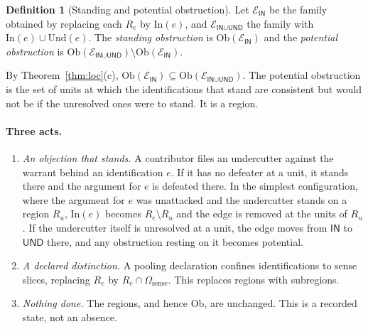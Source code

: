 \documentclass[11pt]{article}
\theoremstyle{plain}
\theoremstyle{definition}
\newtheorem{definition}[theorem]{Definition}
\theoremstyle{remark}
\newcommand{\Om}{\Omega}
\newcommand{\Ob}{\mathrm{Ob}}
\newcommand{\IN}{\textsf{IN}}
\newcommand{\UND}{\textsf{UND}}
\begin{document}
\begin{definition}[Standing and potential obstruction]
Let $\mathcal E_{\IN}$ be the family obtained by replacing each $R_e$ by $\mathrm{In}(e)$, and $\mathcal E_{\IN\cup\UND}$ the family with $\mathrm{In}(e)\cup\mathrm{Und}(e)$. The \emph{standing obstruction} is $\Ob(\mathcal E_{\IN})$ and the \emph{potential obstruction} is $\Ob(\mathcal E_{\IN\cup\UND})\setminus\Ob(\mathcal E_{\IN})$.
\end{definition}

By Theorem~\ref{thm:loc}(c), $\Ob(\mathcal E_{\IN})\subseteq\Ob(\mathcal E_{\IN\cup\UND})$. The potential obstruction is the set of units at which the identifications that stand are consistent but would not be if the unresolved ones were to stand. It is a region.

\paragraph{Three acts.}
\begin{enumerate}[label=(\roman*)]
\item \emph{An objection that stands.} A contributor files an undercutter against the warrant behind an identification $e$. If it has no defeater at a unit, it stands there and the argument for $e$ is defeated there. In the simplest configuration, where the argument for $e$ was unattacked and the undercutter stands on a region $R_u$, $\mathrm{In}(e)$ becomes $R_e\setminus R_u$ and the edge is removed at the units of $R_u$. If the undercutter itself is unresolved at a unit, the edge moves from $\IN$ to $\UND$ there, and any obstruction resting on it becomes potential.
\item \emph{A declared distinction.} A pooling declaration confines identifications to sense slices, replacing $R_e$ by $R_e\cap\Om_{\text{sense}}$. This replaces regions with subregions.
\item \emph{Nothing done.} The regions, and hence $\Ob$, are unchanged. This is a recorded state, not an absence.
\end{enumerate}
\end{document}
